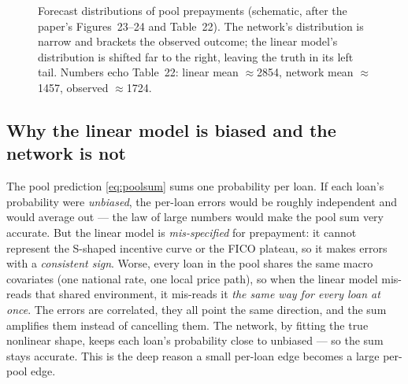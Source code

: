 \documentclass[11pt]{article}
\begin{document}
\begin{figure}[H]
\centering
{}
\caption{Forecast distributions of pool prepayments (schematic, after the paper's
Figures~23--24 and Table~22). The network's distribution is narrow and brackets the observed
outcome; the linear model's distribution is shifted far to the right, leaving the truth in its
left tail. Numbers echo Table~22: linear mean $\approx$2854, network mean $\approx$1457,
observed $\approx$1724.}
\end{figure}

\subsection{Why the linear model is biased and the network is not}

\begin{derivation}
The pool prediction \eqref{eq:poolsum} sums one probability per loan. If each loan's
probability were \emph{unbiased}, the per-loan errors would be roughly independent and would
average out --- the law of large numbers would make the pool sum very accurate. But the linear
model is \emph{mis-specified} for prepayment: it cannot represent the S-shaped incentive curve
or the FICO plateau, so it makes errors with a \emph{consistent sign}. Worse, every loan in
the pool shares the same macro covariates (one national rate, one local price path), so when
the linear model mis-reads that shared environment, it mis-reads it \emph{the same way for
every loan at once}. The errors are correlated, they all point the same direction, and the sum
amplifies them instead of cancelling them. The network, by fitting the true nonlinear shape,
keeps each loan's probability close to unbiased --- so the sum stays accurate. This is the
deep reason a small per-loan edge becomes a large per-pool edge.
\end{derivation}
\end{document}
